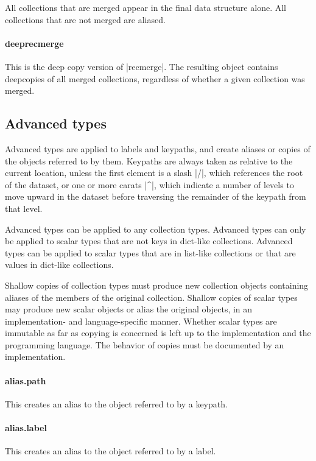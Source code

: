 \documentclass[11pt]{article}
\begin{document}
{{All collections that are merged appear in the final data structure alone.  All collections that are not merged are aliased.


\paragraph{deeprecmerge}

This is the deep copy version of |recmerge|.  The resulting object contains deepcopies of all merged collections, regardless of whether a given collection was merged.



\subsection{Advanced types}
\label{sec:advanced-options-and-types:types}

Advanced types are applied to labels and keypaths, and create aliases or copies of the objects referred to by them.  Keypaths are always taken as relative to the current location, unless the first element is a slash |/|, which references the root of the dataset, or one or more carats |^|, which indicate a number of levels to move upward in the dataset before traversing the remainder of the keypath from that level.

Advanced types can be applied to any collection types.  Advanced types can only be applied to scalar types that are not keys in dict-like collections.  Advanced types can be applied to scalar types that are in list-like collections or that are values in dict-like collections.

Shallow copies of collection types must produce new collection objects containing aliases of the members of the original collection.  Shallow copies of scalar types may produce new scalar objects or alias the original objects, in an implementation- and language-specific manner.  Whether scalar types are immutable as far as copying is concerned is left up to the implementation and the programming language.  The behavior of copies must be documented by an implementation.

\paragraph{alias.path}
This creates an alias to the object referred to by a keypath.

\paragraph{alias.label}
This creates an alias to the object referred to by a label.

}}
\end{document}
